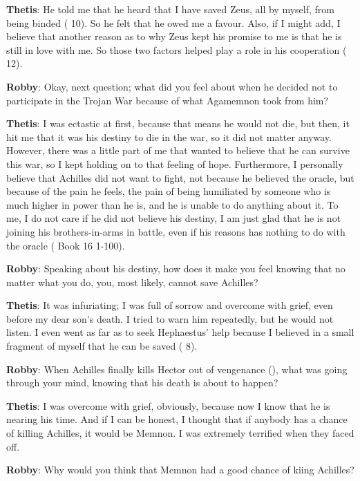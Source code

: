 \documentclass[12pt, a4paper]{article}
\begin{document}
\textbf{Thetis}: He told me that he heard that I have saved Zeus, all by myself, from being binded (\cite{wrath-of-thetis} 10). So he felt that he owed me a favour. Also, if I might add, I believe that another reason as to why Zeus kept his promise to me is that he is still in love with me. So those two factors helped play a role in his cooperation (\cite{wrath-of-thetis} 12).

\textbf{Robby}: Okay, next question; what did you feel about when he decided not to participate in the Trojan War because of what Agamemnon took from him?

\textbf{Thetis}: I was ectastic at first, because that means he would not die, but then, it hit me that it was his destiny to die in the war, so it did not matter anyway. However, there was a little part of me that wanted to believe that he can survive this war, so I kept holding on to that feeling of hope. Furthermore, I personally believe that Achilles did not want to fight, not because he believed the oracle, but because of the pain he feels, the pain of being humiliated by someone who is much higher in power than he is, and he is unable to do anything about it. To me, I do not care if he did not believe his destiny, I am just glad that he is not joining his brothers-in-arms in battle, even if his reasons has nothing to do with the oracle (\cite{homer_iliad_2015} Book 16 1-100).

\textbf{Robby}: Speaking about his destiny, how does it make you feel knowing that no matter what you do, you, most likely, cannot save Achilles?

\textbf{Thetis}: It was infuriating; I was full of sorrow and overcome with grief, even before my dear son's death. I tried to warn him repeatedly, but he would not listen. I even went as far as to seek Hephaestus' help because I believed in a small fragment of myself that he can be saved (\cite{wrath-of-thetis} 8).

\textbf{Robby}: When Achilles finally kills Hector out of vengenance (\cite{homer_iliad_2015}), what was going through your mind, knowing that his death is about to happen?

\textbf{Thetis}: I was overcome with grief, obviously, because now I know that he is nearing his time. And if I can be honest, I thought that if anybody has a chance of killing Achilles, it would be Memnon. I was extremely terrified when they faced off.

\textbf{Robby}: Why would you think that Memnon had a good chance of kiing Achilles?
\end{document}
